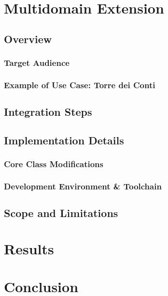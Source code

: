 \documentclass{article}
\begin{document}
\section{Multidomain Extension}
\subsection{Overview}
\noindent


\subsubsection{Target Audience}
\noindent


\subsubsection{Example of Use Case: Torre dei Conti}
\noindent


\subsection{Integration Steps}
\noindent


\subsection{Implementation Details}

\subsubsection{Core Class Modifications}
\noindent


\subsubsection{Development Environment \& Toolchain}
\noindent


\subsection{Scope and Limitations}
\noindent


\newpage

\section{Results}
\noindent


\newpage

\section{Conclusion}
\noindent


\newpage



\nocite{*}
\end{document}
